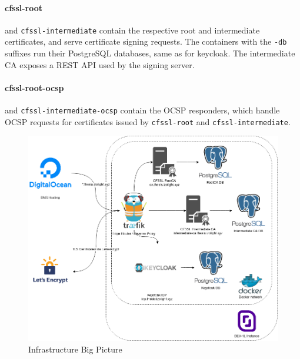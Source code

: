 \paragraph{cfssl-root} and \texttt{cfssl-intermediate} contain the respective root and intermediate certificates,
and serve certificate signing requests.
The containers with the \texttt{-db} suffixes run their PostgreSQL databases, same as for keycloak.
The intermediate \gls{CA} exposes a \gls{REST} \gls{API} used by the signing server.
\paragraph{cfssl-root-ocsp} and \texttt{cfssl-intermediate-ocsp} contain the \gls{OCSP} responders,
which handle \gls{OCSP} requests for certificates issued by \texttt{cfssl-root} and \texttt{cfssl-intermediate}.

\begin{figure}
    \begin{center}
        \includegraphics[width=\linewidth]{images/infrastructure.png}
        \caption{Infrastructure Big Picture}
        \label{fig:infrastructurebigpicture}
    \end{center}
\end{figure}

